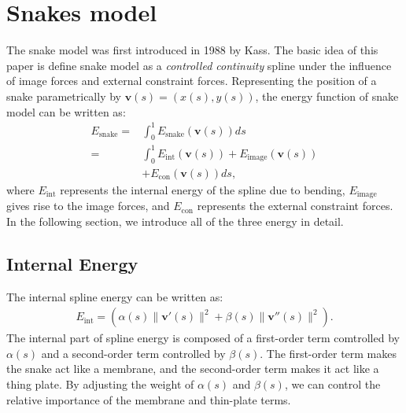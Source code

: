\documentclass[journal]{IEEEtran}
\begin{document}
\section{Snakes model}
The snake model was first introduced in 1988 by Kass\cite{snake}. The basic idea of this paper is define snake model as a \textit{controlled continuity}\cite{s18} spline under the influence of image forces and external constraint forces. Representing the position of a snake parametrically by $\mathbf{v}(s)=(x(s),y(s))$, the energy function of snake model can be written as:
\begin{equation}\begin{aligned}
E_{\text{snake}}=&\int_0^1 E_{\text{snake}}(\mathbf{v}(s))ds\\
=&\int_0^1 E_{\text{int}}(\mathbf{v}(s))+E_{\text{image}}(\mathbf{v}(s))\\
&+E_{\text{con}}(\mathbf{v}(s))ds,\label{eq1}
\end{aligned}\end{equation}
where $E_{\text{int}}$ represents the internal energy of the spline due to bending, $E_{\text{image}}$ gives rise to the image forces, and $E_{\text{con}}$ represents the external constraint forces. In the following section, we introduce all of the three energy in detail.
\subsection{Internal Energy}
The internal spline energy can be written as:
\begin{equation}\begin{aligned}
E_{\text{int}}=(\alpha(s)\|\mathbf{v}'(s)\|^2+\beta(s)\|\mathbf{v}''(s)\|^2).
\end{aligned}\end{equation}
The internal part of spline energy is composed of a first-order term comtrolled by $\alpha(s)$ and a second-order term controlled by $\beta(s)$. The first-order term makes the snake act like a membrane, and the second-order term makes it act like a thing plate. By adjusting the weight of $\alpha(s)$ and $\beta(s)$, we can control the relative importance of the membrane and thin-plate terms.
\end{document}
